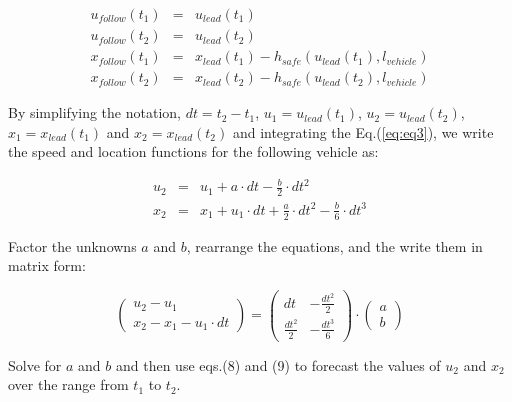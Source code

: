 \documentclass[Proceedings]{ascelike}
\begin{document}
\begin{eqnarray} 
u_{follow}(t_1) &=& u_{lead}(t_1) \\
u_{follow}(t_2) &=& u_{lead}(t_2) \\
x_{follow}(t_1) &=& x_{lead}(t_1) - h_{safe}(u_{lead}(t_1), l_{vehicle}) \\
x_{follow}(t_2) &=& x_{lead}(t_2) - h_{safe}(u_{lead}(t_2), l_{vehicle})  
\end{eqnarray}

\noindent By simplifying  the notation, $dt = t_2 - t_1$, $u_1 = u_{lead}(t_1)$,  $u_2 = u_{lead}(t_2)$, $x_1 = x_{lead}(t_1)$ and $x_2 = x_{lead}(t_2)$ and integrating the Eq.(\ref{eq:eq3}), we write the speed and location functions for the following vehicle as:

\begin{eqnarray} 
u_2 &=& u_1 + a \cdot dt - \frac{b}{2} \cdot dt^2 \\
x_2 &=& x_1 + u_1 \cdot dt + \frac{a}{2}  \cdot dt^2 - \frac{b}{6} \cdot dt^3  
\end{eqnarray}

\noindent Factor the unknowns $a$ and $b$, rearrange the equations, and the  write them in matrix form:

\begin{equation}
  \begin{pmatrix}
 u_2 - u_1 \\
 x_2 - x_1 - u_1 \cdot dt
\end{pmatrix} =
\begin{pmatrix}
    dt & - \frac{dt^2}{2}\\
    \frac{dt^2}{2} & - \frac{dt^3}{6}
  \end{pmatrix} \cdot
  \begin{pmatrix}
    a \\
    b
    \end{pmatrix}
\end{equation}

\noindent Solve for $a$ and $b$ and then use eqs.(8) and (9) to forecast the values of $u_2$ and $x_2$ over the range from $t_1$ to $t_2$. 
\end{document}
